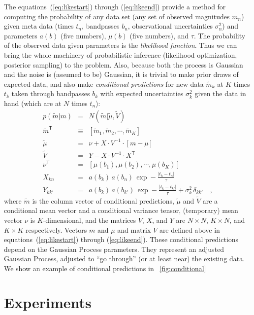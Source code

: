 \documentclass[letterpaper,12pt,preprint]{aastex}
\newcommand{\transpose}[1]{{#1}^{\mathsf{T}}}
\newcommand{\inverse}[1]{{#1}^{-1}}
\begin{document}
The equations~(\ref{eq:likestart}) through (\ref{eq:likeend})
provide a method for computing the probability of any data set (any
set of observed magnitudes $m_n$) given meta data (times $t_n$,
bandpasses $b_n$, observational uncertainties $\sigma_n^2$) and
parameters $a(b)$ (five numbers), $\mu(b)$ (five numbers), and $\tau$.
The probability of the observed data given parameters is the
\emph{likelihood function}.  Thus we can bring the whole machinery of
probabilistic inference (likelihood optimization, posterior sampling)
to the problem.  Also, because both the process is Gaussian and the
noise is (assumed to be) Gaussian, it is trivial to make prior draws
of expected data, and also make \emph{conditional predictions} for new
data $\tilde{m}_k$ at $K$ times $t_k$ taken through bandpasses $b_k$ with
expected uncertainties $\sigma_k^2$ given the data in hand (which are
at $N$ times $t_n$):
\begin{eqnarray}
p(\tilde{m}|m) &=& N(\tilde{m}|\tilde{\mu},\tilde{V})
\\
\transpose{\tilde{m}} &\equiv& [\tilde{m}_1, \tilde{m}_2, \cdots , \tilde{m}_K]
\\
\tilde{\mu} &=& \nu + X\cdot\inverse{V}\cdot [m - \mu]
\\
\tilde{V} &=& Y - X\cdot\inverse{V}\cdot\transpose{X}
\\
\transpose{\nu} &=& [\mu(b_1), \mu(b_2), \cdots , \mu(b_K)]
\\
X_{kn} &=& a(b_k)\,a(b_n)\,\exp -\frac{|t_k - t_n|}{\tau}
\\
Y_{kk'} &=& a(b_k)\,a(b_{k'})\,\exp -\frac{|t_k - t_{k'}|}{\tau} + \sigma_k^2\,\delta_{kk'}
\quad ,
\end{eqnarray}
where $\tilde{m}$ is the column vector of conditional predictions,
$\tilde{\mu}$ and $\tilde{V}$ are a conditional mean vector and a
conditional variance tensor, (temporary) mean vector $\nu$ is
$K$-dimensional, and the matrices $V$, $X$, and $Y$ are $N\times N$,
$K\times N$, and $K\times K$ respectively.  Vectors $m$ and $\mu$ and
matrix $V$ are defined above in equations~(\ref{eq:likestart}) through
(\ref{eq:likeend}).  These conditional predictions depend on the
Gaussian Process parameters.  They represent an adjusted Gaussian
Process, adjusted to ``go through'' (or at least near) the existing
data.  We show an example of conditional predictions in
\figurename~\ref{fig:conditional}

\section{Experiments}
\end{document}
